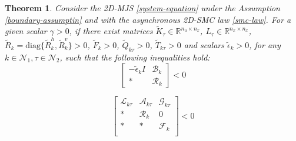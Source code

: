 \documentclass[conference]{IEEEtran}
\newtheorem{theorem}{Theorem}
\begin{document}
\begin{theorem}\label{theorem3}
	Consider the 2D-MJS \eqref{system-equation} under the Assumption \eqref{boundary-assumptin} and with the asynchronous 2D-SMC law \eqref{smc-law}.  For a given scalar $\gamma>0$, if there exist matrices $\tilde{K}_{\tau }\in\mathbb{R}^{n_u\times n_x}$, $L_{\tau }\in\mathbb{R}^{n_x\times n_x}$, $\tilde{R}_{k}=\mathrm{diag}\{\tilde{R}^{h}_{k},\tilde{R}^{v}_{k}\}>0$, $\tilde{F}_{k}>0$,  $\tilde{Q}_{k\tau }>0$, $\tilde{T}_{k\tau }>0$ and scalars $\tilde{\epsilon}_{k}>0$, for any $k\in\mathcal{N}_{1}, \tau\in\mathcal{N}_{2}$,  such that the following inequalities hold: 
	\begin{equation} \label{T3C1}
		\begin{bmatrix}
			-\tilde{\epsilon}_{k}I &\mathscr{B}_{k}\\
			*& \mathscr{R}_{k}
		\end{bmatrix} < 0
	\end{equation}
	
	\begin{equation} \label{T3C2}
		\begin{bmatrix}
			\mathscr{L}_{k\tau }&\mathscr{A}_{k\tau }&\mathscr{G}_{k\tau }\\
			*&\mathscr{R}_{k}&0\\
			*&*&\mathscr{F}_{k}\\
		\end{bmatrix}<0
	\end{equation}
	

\end{theorem}
\end{document}
